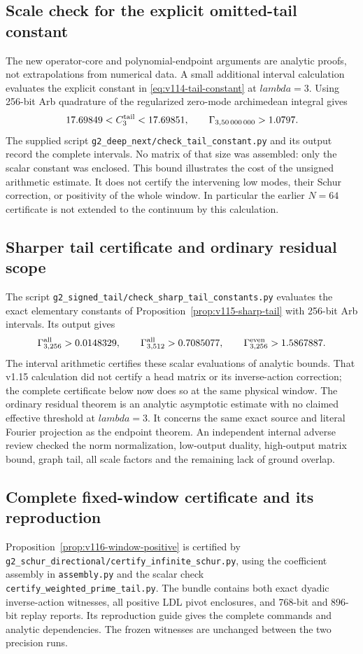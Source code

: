 \documentclass[11pt]{article}
\def\lambda{lambda}%
\theoremstyle{remark}
\begin{document}
\subsection{Scale check for the explicit omitted-tail constant}
The new operator-core and polynomial-endpoint arguments are analytic
proofs, not extrapolations from numerical data. A small additional
interval calculation evaluates the explicit constant in
\eqref{eq:v114-tail-constant} at $\lambda=3$. Using 256-bit Arb
quadrature of the regularized zero-mode archimedean integral gives
\[
 17.69849<C_3^{\rm tail}<17.69851,\qquad
 \Gamma_{3,50\,000\,000}>1.0797.
\]
The supplied script \texttt{g2\_deep\_next/check\_tail\_constant.py}
and its output record the complete intervals. No matrix of that size
was assembled: only the scalar constant was enclosed. This bound
illustrates the cost of the unsigned arithmetic estimate. It does not
certify the intervening low modes, their Schur correction, or positivity
of the whole window. In particular the earlier $N=64$ certificate is
not extended to the continuum by this calculation.

\subsection{Sharper tail certificate and ordinary residual scope}
The script \texttt{g2\_signed\_tail/check\_sharp\_tail\_constants.py}
evaluates the exact elementary constants of
Proposition~\ref{prop:v115-sharp-tail} with 256-bit Arb intervals.
Its output gives
\[
 \Gamma^{\rm all}_{3,256}>0.0148329,\qquad
 \Gamma^{\rm all}_{3,512}>0.7085077,\qquad
 \Gamma^{\rm even}_{3,256}>1.5867887.
\]
The interval arithmetic certifies these scalar evaluations of analytic
bounds. That v1.15 calculation did not certify a head matrix or its
inverse-action correction; the complete certificate below now does so
at the same physical window. The ordinary residual theorem is an analytic
asymptotic estimate with no claimed effective threshold at $\lambda=3$.
It concerns the same exact source and literal Fourier projection as
the endpoint theorem. An independent internal adverse review checked
the norm normalization, low-output duality, high-output matrix bound,
graph tail, all scale factors and the remaining lack of ground overlap.

\subsection{Complete fixed-window certificate and its reproduction}
Proposition~\ref{prop:v116-window-positive} is certified by
\texttt{g2\_schur\_directional/certify\_infinite\_schur.py}, using
the coefficient assembly in \texttt{assembly.py} and the scalar check
\texttt{certify\_weighted\_prime\_tail.py}. The bundle contains both
exact dyadic inverse-action witnesses, all positive LDL pivot enclosures,
and 768-bit and 896-bit replay reports. Its reproduction guide gives
the complete commands and analytic dependencies. The frozen witnesses
are unchanged between the two precision runs.
\end{document}
